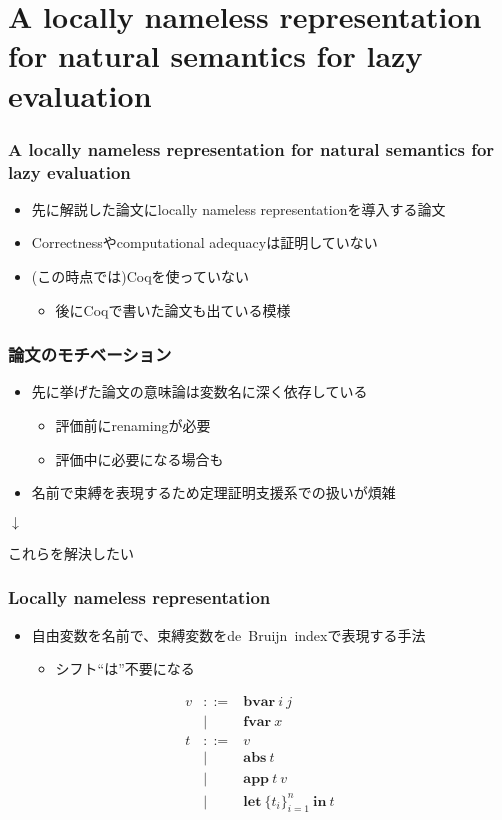 \documentclass[dvipdfmx,cjk,xcolor=dvipsnames,envcountsect,notheorems,12pt]{beamer}
\theoremstyle{definition}
\newcommand{\keyword}[1]{\mathbf{#1}}
\newcommand{\LET}{\keyword{let}}
\newcommand{\IN}{\keyword{in}}
\newcommand{\BVAR}{\keyword{bvar}}
\newcommand{\FVAR}{\keyword{fvar}}
\newcommand{\ABS}{\keyword{abs}}
\newcommand{\APP}{\keyword{app}}
\begin{document}
\section{A locally nameless representation for natural semantics for lazy evaluation}

\begin{frame}
	\frametitle{A locally nameless representation for natural semantics for lazy evaluation}
	\begin{itemize}
		\item 先に解説した論文にlocally nameless representationを導入する論文
		\item Correctnessやcomputational adequacyは証明していない
		\item (この時点では)Coqを使っていない
			\begin{itemize}
				\item 後にCoqで書いた論文も出ている模様
			\end{itemize}
	\end{itemize}
\end{frame}

\begin{frame}
	\frametitle{論文のモチベーション}
	\begin{itemize}
		\item 先に挙げた論文の意味論は変数名に深く依存している
			\begin{itemize}
				\item 評価前にrenamingが必要
				\item 評価中に必要になる場合も
			\end{itemize}
		\item 名前で束縛を表現するため定理証明支援系での扱いが煩雑
	\end{itemize}
	\vfill
	\LARGE
	\begin{center}$\downarrow$\end{center}
	\vfill
	\begin{center}これらを解決したい\end{center}
\end{frame}

\begin{frame}
	\frametitle{Locally nameless representation}
	\begin{itemize}
		\item 自由変数を名前で、束縛変数を\mbox{de Bruijn index}で表現する手法
			\begin{itemize}
				\item シフト``は''不要になる
			\end{itemize}
	\end{itemize}
	\large 

	\begin{eqnarray*}
		v & ::= & \BVAR~i~j \\
			& | & \FVAR~x \\
		t & ::= & v \\
			& | & \ABS~t \\
			& | & \APP~t~v \\
			& | & \LET~\{t_i\}^n_{i=1}~\IN~t
	\end{eqnarray*}
\end{frame}
\end{document}
